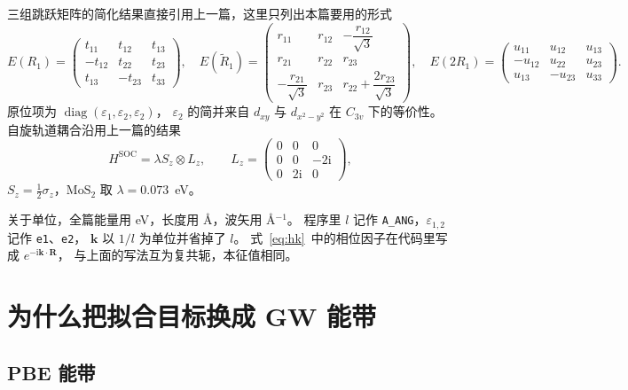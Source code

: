 \documentclass[11pt,a4paper]{ctexart}
\newcommand{\kk}{\mathbf{k}}
\newcommand{\RR}{\mathbf{R}}
\newcommand{\eps}{\varepsilon}
\newcommand{\ii}{\mathrm{i}}
\begin{document}
三组跳跃矩阵的简化结果直接引用上一篇，这里只列出本篇要用的形式
\begin{equation}
E(R_1)=
\begin{pmatrix}
t_{11} & t_{12} & t_{13}\\
-t_{12} & t_{22} & t_{23}\\
t_{13} & -t_{23} & t_{33}
\end{pmatrix},\quad
E(\tilde{R}_1)=
\begin{pmatrix}
r_{11} & r_{12} & -\dfrac{r_{12}}{\sqrt3}\\[1.5mm]
r_{21} & r_{22} & r_{23}\\[1.5mm]
-\dfrac{r_{21}}{\sqrt3} & r_{23} & r_{22}+\dfrac{2r_{23}}{\sqrt3}
\end{pmatrix},\quad
E(2R_1)=
\begin{pmatrix}
u_{11} & u_{12} & u_{13}\\
-u_{12} & u_{22} & u_{23}\\
u_{13} & -u_{23} & u_{33}
\end{pmatrix}.
\label{eq:hop}
\end{equation}
原位项为 $\operatorname{diag}(\eps_1,\eps_2,\eps_2)$，
$\eps_2$ 的简并来自 $d_{xy}$ 与 $d_{x^2-y^2}$ 在 $C_{3v}$ 下的等价性。
自旋轨道耦合沿用上一篇的结果
\begin{equation}
H^{\mathrm{SOC}}=\lambda S_z\otimes L_z ,
\qquad
L_z=
\begin{pmatrix}
0&0&0\\
0&0&-2\ii\\
0&2\ii&0
\end{pmatrix},
\label{eq:soc}
\end{equation}
$S_z=\frac12\sigma_z$，$\mathrm{MoS_2}$ 取 $\lambda=0.073$~eV。

关于单位，全篇能量用 eV，长度用 \AA{}，波矢用 \AA$^{-1}$。
程序里 $l$ 记作 \texttt{A\_ANG}，$\eps_{1,2}$ 记作 \texttt{e1}、\texttt{e2}，
$\kk$ 以 $1/l$ 为单位并省掉了 $l$。
式~\eqref{eq:hk}~中的相位因子在代码里写成 $e^{-\ii\kk\cdot\RR}$，
与上面的写法互为复共轭，本征值相同。

\newpage
\section{为什么把拟合目标换成 GW 能带}

\subsection{PBE 能带}
\end{document}
